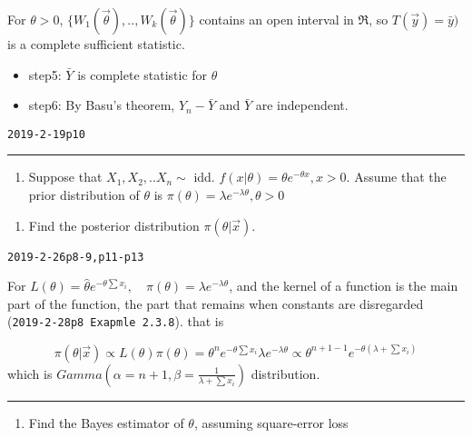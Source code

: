 \documentclass[12pt,]{article}
\providecommand{\tightlist}{%
  \setlength{\itemsep}{0pt}\setlength{\parskip}{0pt}}
\begin{document}
For \(\theta>0\), \(\{W_1(\vec \theta),..,W_k(\vec \theta)\}\) contains
an open interval in \(\Re\), so \(T(\vec y)=\bar y)\) is a complete
sufficient statistic.

\begin{itemize}
\item
  step5: \(\bar Y\) is complete statistic for \(\theta\)
\item
  step6: By Basu's theorem, \(Y_n-\bar Y\) and \(\bar Y\) are
  independent.
\end{itemize}

\texttt{2019-2-19p10}

\begin{center}\rule{0.5\linewidth}{\linethickness}\end{center}

\begin{enumerate}
\def\labelenumi{\arabic{enumi}.}
\setcounter{enumi}{2}
\tightlist
\item
  \textcolor[rgb]{0.5,0.5,0.5}{Suppose that $X_1,X_2,..X_n\sim$ idd. $f(x|\theta)=\theta e^{-\theta x}, x>0$. Assume that the prior distribution of $\theta$ is $\pi(\theta)=\lambda e^{-\lambda\theta},\theta>0$}
\end{enumerate}

\begin{enumerate}
\def\labelenumi{\alph{enumi}.}
\tightlist
\item
  \textcolor[rgb]{0.5,0.5,0.5}{Find the posterior distribution $\pi(\theta|\vec x)$.}
\end{enumerate}

\texttt{2019-2-26p8-9,p11-p13}

For
\(L(\theta)=\hat\theta e^{-\theta\sum x_i},\quad \pi(\theta)=\lambda e^{-\lambda\theta}\),
and the kernel of a function is the main part of the function, the part
that remains when constants are disregarded
(\texttt{2019-2-28p8\ Exapmle\ 2.3.8}). that is

\[\pi(\theta|\vec x)\propto L(\theta)\pi(\theta)=\theta^n e^{-\theta\sum x_i}\lambda e^{-\lambda\theta}\propto\theta^{n+1-1}e^{-\theta(\lambda+\sum x_i)}\]
which is \(Gamma(\alpha=n+1,\beta=\frac1{\lambda+\sum x_i})\)
distribution.

\begin{center}\rule{0.5\linewidth}{\linethickness}\end{center}

\begin{enumerate}
\def\labelenumi{\alph{enumi}.}
\setcounter{enumi}{1}
\tightlist
\item
  \textcolor[rgb]{0.5,0.5,0.5}{Find the Bayes estimator of $\theta$, assuming square-error loss}
\end{enumerate}
\end{document}
